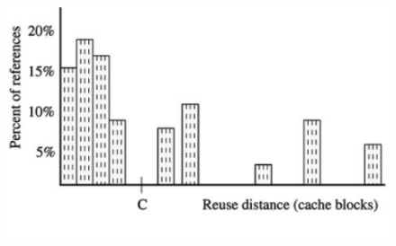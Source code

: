\documentclass[12pt]{article}
\begin{document}

\begin{figure}[H]
\advance\leftskip 0.02in		\includegraphics[width=4.91in,height=2.98in]{./media/image1.jpeg}
\end{figure}



\par


\vspace{\baselineskip}

\vspace{\baselineskip}

\vspace{\baselineskip}

\vspace{\baselineskip}

\vspace{\baselineskip}

\vspace{\baselineskip}

\vspace{\baselineskip}

\vspace{\baselineskip}

\vspace{\baselineskip}

\vspace{\baselineskip}

\vspace{\baselineskip}

\vspace{\baselineskip}

\vspace{\baselineskip}
\end{document}
